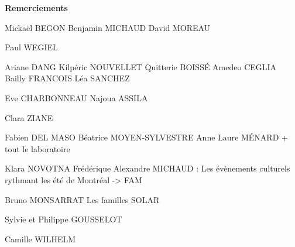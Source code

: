 \newpage
{}
\textbf{\Huge Remerciements}
\vspace{0.5cm}\\\tab

Mickaël BEGON
Benjamin MICHAUD
David MOREAU

Paul WEGIEL

Ariane DANG
Kilpéric NOUVELLET
Quitterie BOISS\'E
Amedeo CEGLIA
Bailly FRANCOIS
Léa SANCHEZ

Eve CHARBONNEAU
Najoua ASSILA

Clara ZIANE

Fabien DEL MASO
Béatrice MOYEN-SYLVESTRE
Anne Laure M\'ENARD
+ tout le laboratoire


Klara NOVOTNA
Frédérique Alexandre MICHAUD : Les évènements culturels rythmant les été de Montréal -> FAM


Bruno MONSARRAT
Les familles SOLAR

Sylvie et Philippe GOUSSELOT

Camille WILHELM

